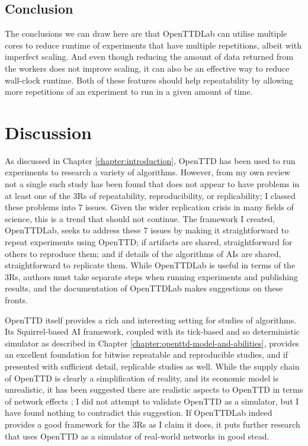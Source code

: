 \documentclass[logo,msc,dsti]{style/infthesis}    %
\begin{document}
{\section{Conclusion}

The conclusions we can draw here are that OpenTTDLab can utilise multiple cores to reduce runtime of experiments that have multiple repetitions, albeit with imperfect scaling. And even though reducing the amount of data returned from the workers does not improve scaling, it can also be an effective way to reduce wall-clock runtime. Both of these features should help repeatability by allowing more repetitions of an experiment to run in a given amount of time.

\chapter{Discussion}
\label{chapter:discussion}

As discussed in Chapter \ref{chapter:introduction}, OpenTTD has been used to run experiments to research a variety of algorithms. However, from my own review not a single such study has been found that does not appear to have problems in at least one of the 3Rs of repeatability, reproducibility, or replicability; I classed these problems into 7 issues. Given the wider replication crisis in many fields of science, this is a trend that should not continue. The framework I created, OpenTTDLab, seeks to address these 7 issues by making it straightforward to repeat experiments using OpenTTD; if artifacts are shared, straightforward for others to reproduce them; and if details of the algorithms of AIs are shared, straightforward to replicate them. While OpenTTDLab is useful in terms of the 3Rs, authors must take separate steps when running experiments and publishing results, and the documentation of OpenTTDLab makes suggestions on these fronts.

OpenTTD itself provides a rich and interesting setting for studies of algorithms. Its Squirrel-based AI framework, coupled with its tick-based and so deterministic simulator as described in Chapter \ref{chapter:openttd-model-and-abilities}, provides an excellent foundation for bitwise repeatable and reproducible studies, and if presented with sufficient detail, replicable studies as well. While the supply chain of OpenTTD is clearly a simplification of reality, and its economic model is unrealistic, it has been suggested there are realistic aspects to OpenTTD in terms of network effects \cite{raghothama2013review}; I did not attempt to validate OpenTTD as a simulator, but I have found nothing to contradict this suggestion. If OpenTTDLab indeed provides a good framework for the 3Rs as I claim it does, it puts further research that uses OpenTTD as a simulator of real-world networks in good stead.

}
\end{document}
